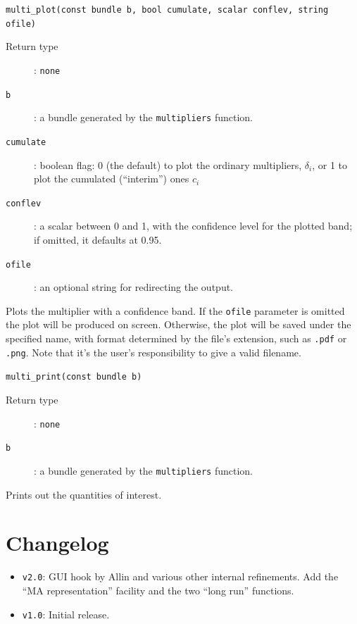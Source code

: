 \documentclass[a4paper,10pt]{article}
\newenvironment{funcdoc}[1]
{\noindent\hrulefill\newline\texttt{#1}\par\noindent\hrulefill\par\medskip\par}
{\bigskip}
\begin{document}
\begin{funcdoc}{multi\_plot(const bundle b, bool cumulate, scalar conflev,
			 string ofile)}
  \begin{description}
  \item[Return type]: \texttt{none}
  \item[\texttt{b}]: a bundle generated by the \texttt{multipliers} function.
  \item[\texttt{cumulate}]: boolean flag: 0 (the default) to plot the
    ordinary multipliers, $\delta_i$, or 1 to plot the cumulated
    (``interim'') ones $c_i$
  \item[\texttt{conflev}]: a scalar between 0 and 1, with the
    confidence level for the plotted band; if omitted, it defaults at 0.95.
  \item[\texttt{ofile}]: an optional string for redirecting the output.
\end{description}
\noindent Plots the multiplier with a confidence band. If the
\texttt{ofile} parameter is omitted the plot will be produced on
screen. Otherwise, the plot will be saved under the specified name,
with format determined by the file's extension, such as \texttt{.pdf}
or \texttt{.png}. Note that it's the user's responsibility to give a
valid filename.  
\end{funcdoc}

\begin{funcdoc}{multi\_print(const bundle b)}
  \begin{description}
  \item[Return type]: \texttt{none}
  \item[\texttt{b}]: a bundle generated by the \texttt{multipliers} function.
\end{description}
\noindent Prints out the quantities of interest.
\end{funcdoc}





\section*{Changelog}
\begin{itemize}
\item \texttt{v2.0}: GUI hook by Allin and various other internal
  refinements. Add the ``MA representation'' facility and the two
  ``long run'' functions.
\item \texttt{v1.0}: Initial release.
\end{itemize}
\end{document}
